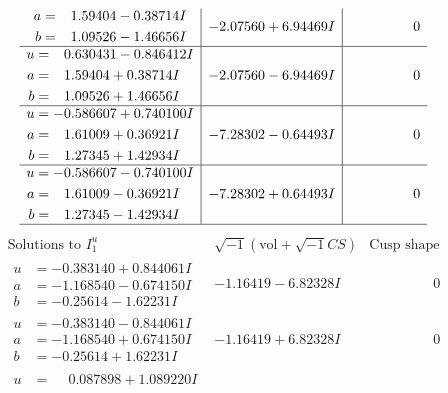 \documentclass[1p]{elsarticle_modified}
\theoremstyle{definition}
\newcommand{\I}{\sqrt{-1}}
\begin{document}
$$\begin{array}{c|c|c}
\begin{aligned}
a &= \phantom{-}1.59404 - 0.38714 I \\
b &= \phantom{-}1.09526 - 1.46656 I\end{aligned}
 & -2.07560 + 6.94469 I & \phantom{-0.000000 } 0 \\ \hline\begin{aligned}
u &= \phantom{-}0.630431 - 0.846412 I \\
a &= \phantom{-}1.59404 + 0.38714 I \\
b &= \phantom{-}1.09526 + 1.46656 I\end{aligned}
 & -2.07560 - 6.94469 I & \phantom{-0.000000 } 0 \\ \hline\begin{aligned}
u &= -0.586607 + 0.740100 I \\
a &= \phantom{-}1.61009 + 0.36921 I \\
b &= \phantom{-}1.27345 + 1.42934 I\end{aligned}
 & -7.28302 - 0.64493 I & \phantom{-0.000000 } 0 \\ \hline\begin{aligned}
u &= -0.586607 - 0.740100 I \\
a &= \phantom{-}1.61009 - 0.36921 I \\
b &= \phantom{-}1.27345 - 1.42934 I\end{aligned}
 & -7.28302 + 0.64493 I & \phantom{-0.000000 } 0\\
 \hline 
 \end{array}$$\newpage$$\begin{array}{c|c|c}  
\text{Solutions to }I^u_{1}& \I (\text{vol} + \sqrt{-1}CS) & \text{Cusp shape}\\
 \hline 
\begin{aligned}
u &= -0.383140 + 0.844061 I \\
a &= -1.168540 - 0.674150 I \\
b &= -0.25614 - 1.62231 I\end{aligned}
 & -1.16419 - 6.82328 I & \phantom{-0.000000 } 0 \\ \hline\begin{aligned}
u &= -0.383140 - 0.844061 I \\
a &= -1.168540 + 0.674150 I \\
b &= -0.25614 + 1.62231 I\end{aligned}
 & -1.16419 + 6.82328 I & \phantom{-0.000000 } 0 \\ \hline\begin{aligned}
u &= \phantom{-}0.087898 + 1.089220 I \\

\end{aligned}
\end{array}$$
\end{document}
